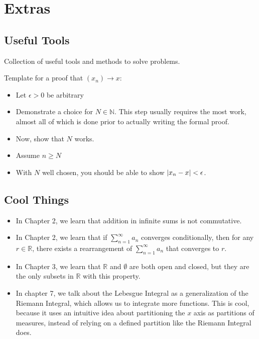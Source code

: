 \appendix
\chapter{Extras}
\section{Useful Tools}

Collection of useful tools and methods to solve problems.

\begin{tip}
  Template for a proof that $(x_n) \rightarrow x$:
  \begin{itemize}
    \item Let $\epsilon > 0$ be arbitrary 
    \item Demonstrate a choice for $N \in \mathbb{N}$. 
    This step usually requires the most work, almost all of
    which is done prior to actually writing the formal proof.
    \item Now, show that $N$ works.
    \item Assume $n \geq N$
    \item With $N$ well chosen,  you should be able to show $\abs{x_n - x} < \epsilon$.
  \end{itemize}
\end{tip}

\section{Cool Things}
\begin{itemize}
  \item In Chapter 2, we learn that addition in infinite sums is not commutative.
  \item In Chapter 2, we learn that if $\sum_{n=1}^\infty a_n$ converges conditionally, then 
  for any $r \in \mathbb{R}$, there exists a rearrangement of $\sum_{n=1}^\infty a_n$ that converges to $r$.
  \item In Chapter 3, we learn that $\mathbb{R}$ and $\emptyset$ are both open and closed, 
  but they are the only subsets in $\mathbb{R}$ with this property.
  \item In chapter 7, we talk about the Lebesgue Integral as a generalization of the Riemann Integral,
  which allows us to integrate more functions. This is cool, because it uses an intuitive
  idea about partitioning the $x$ axis as partitions of measures, instead of relying on 
  a defined partition like the Riemann Integral does.
\end{itemize}


